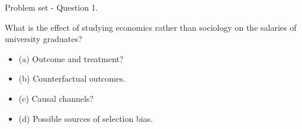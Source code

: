 \documentclass[aspectratio=169, 11pt]{beamer}
\begin{document}
\begin{frame}{Problem set - Question 1.}

What is the effect of studying economics rather than sociology on the salaries of university graduates?

\begin{itemize}
    \item (a) Outcome and treatment?
    \item (b) Counterfactual outcomes.
    \item (c) Causal channels?
    \item (d) Possible sources of selection bias.
\end{itemize}
\end{frame}
\end{document}
